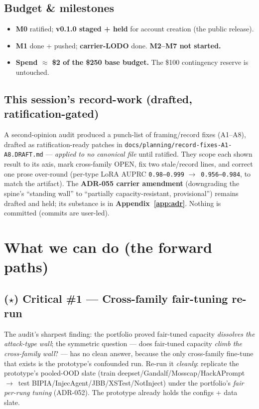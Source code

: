 \documentclass[11pt,parskip=half-]{scrartcl}
\newcommand{\arr}{\ensuremath{\rightarrow}}
\newcommand{\code}[1]{\texttt{\small #1}}
\begin{document}
\subsection{Budget \& milestones}
\begin{itemize}
  \item \textbf{M0} ratified; \textbf{v0.1.0 staged + held} for account creation (the public release).
  \item \textbf{M1} done + pushed; \textbf{carrier-LODO} done. \textbf{M2--M7 not started.}
  \item \textbf{Spend ${\approx}$ \$2 of the \$250 base budget.} The \$100 contingency reserve is
    untouched.
\end{itemize}

\subsection{This session's record-work (drafted, ratification-gated)}
A second-opinion audit produced a punch-list of framing/record fixes (A1--A8), drafted as
ratification-ready patches in \code{docs/planning/record-fixes-A1-A8.DRAFT.md} --- \emph{applied to no
canonical file} until ratified. They scope each shown result to its axis, mark cross-family OPEN, fix
two stale/record lines, and correct one prose over-round (per-type LoRA AUPRC \code{0.98--0.999}
\arr\ \code{0.956--0.984}, to match the artifact). The \textbf{ADR-055 carrier amendment} (downgrading
the spine's ``standing wall'' to ``partially capacity-resistant, provisional'') remains drafted and held;
its substance is in \textbf{Appendix~\ref{app:adr}}. Nothing is committed (commits are user-led).

\section{What we can do (the forward paths)}\label{sec:paths}

\subsection*{(\(\star\)) Critical \#1 --- Cross-family fair-tuning re-run }

The audit's sharpest finding: the portfolio proved fair-tuned capacity \emph{dissolves the attack-type
wall}; the symmetric question --- does fair-tuned capacity \emph{climb the cross-family wall}? --- has no
clean answer, because the only cross-family fine-tune that exists is the prototype's confounded run.
Re-run it \emph{cleanly}: replicate the prototype's pooled-OOD slate (train
deepset/Gandalf/Mosscap/HackAPrompt \arr\ test BIPIA/InjecAgent/JBB/XSTest/NotInject) under the
portfolio's \emph{fair per-rung tuning} (ADR-052). The prototype already holds the configs + data slate.
\end{document}
